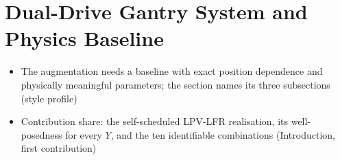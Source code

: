 %
\section{Dual-Drive Gantry System and Physics Baseline}\label{sec:baseline}
\ifdraft
\begin{itemize}
\item The augmentation needs a baseline with exact position dependence and physically meaningful parameters; the section names its three subsections (style profile)
\item Contribution share: the self-scheduled LPV-LFR realisation, its well-posedness for every $Y$, and the ten identifiable combinations (Introduction, first contribution)
\end{itemize}
\fi

